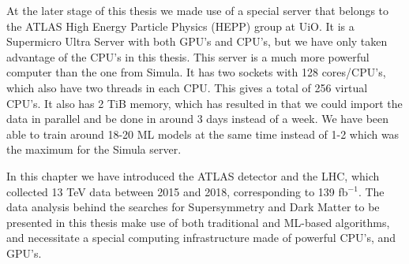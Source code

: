 At the later stage of this thesis we made use of a special server that belongs to the ATLAS High Energy Particle Physics (HEPP) group at UiO. It is a Supermicro Ultra Server with both GPU's and CPU's, but we have only taken advantage of the CPU's in this thesis. This server is a much more powerful computer than the one from Simula. It has two sockets with 128 cores/CPU's, which also have two threads in each CPU. This gives a total of 256 virtual CPU's. It also has 2 TiB memory, which has resulted in that we could import the data in parallel and be done in around 3 days instead of a week. We have been able to train around 18-20 ML models at the same time instead of 1-2 which was the maximum for the Simula server. 

In this chapter we have introduced the ATLAS detector and the LHC, which collected 13 TeV data between 2015 and 2018, corresponding to 139 fb$^{-1}$. The data analysis behind the searches for Supersymmetry and Dark Matter to be presented in this thesis make use of both traditional and ML-based algorithms, and necessitate a special computing infrastructure made of powerful CPU's, and GPU's.